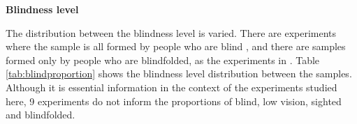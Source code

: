 \textbf{Blindness level}


The distribution between the blindness level is varied. There are experiments where the sample is all formed by people who are blind \cite{Lahav2012,Sanchez2005c}, and there are samples formed only by people who are blindfolded, as the experiments in \cite{Pissaloux2017TowardsDevices}. Table \ref{tab:blindproportion} shows the blindness level distribution between the samples. Although it is essential information in the context of the experiments studied here, 9 experiments do not inform the proportions of blind, low vision, sighted and blindfolded. 
